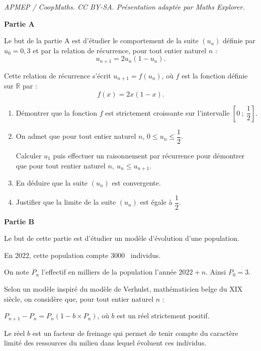 \documentclass[10pt]{article}
\providecommand{\R}{\mathbb{R}}
\providecommand{\np}[2][]{{#2~#1}}
\begin{document}
\noindent\textit{APMEP / CoopMaths. CC BY-SA. Présentation adaptée par Maths Explorer.}\par\medskip
\medskip

\textbf{Partie A}

\medskip

Le but de la partie A est d'étudier le comportement de la suite $\left(u_n\right)$ définie par $u_0 =  0,3$ et par la relation de récurrence, pour tout entier naturel $n$ :
\[u_{n+1} =  2u_n\left(1 - u_n\right).\]

Cette relation de récurrence s'écrit $u_{n+1} =  f\left(u_n\right)$, où $f$ est la fonction définie sur $\R$ par : 
\[f(x) = 2x\left (1 - x\right ).\]

\smallskip
\begin{enumerate}
\item Démontrer que la fonction $f$ est strictement croissante sur l'intervalle $\left[0~;~\dfrac12\right]$.
\item On admet que pour tout entier naturel $n$, $0 \leqslant u_n \leqslant \dfrac12$.

Calculer $u_1$ puis effectuer un raisonnement par récurrence pour démontrer que pour tout rentier naturel $n,\: u_n \leqslant u_{n+1}$.
\item En déduire que la suite $\left(u_n\right)$ est convergente.
\item Justifier que la limite de la suite $\left(u_n\right)$ est égale à $\dfrac12$.
\end{enumerate}

\bigskip

\textbf{Partie B}

\medskip

Le but de cette partie est d'étudier un modèle d'évolution d'une population.

En 2022, cette population compte \np{3000} individus.

\smallskip

On note $P_n$ l'effectif en milliers de la population l'année $2022 + n$. Ainsi $P_0 = 3$.

Selon un modèle inspiré du modèle de Verhulst, mathématicien belge du XIX siècle, on considère que, pour tout entier naturel $n$ :

\begin{center}$P_{n+1} -  P_n = P_n\left(1 -  b \times P_n\right)$, où $b$ est un réel strictement positif.\end{center}

Le réel $b$ est un facteur de freinage qui permet de tenir compte du caractère limité des
ressources du milieu dans lequel évoluent ces individus.
\end{document}

